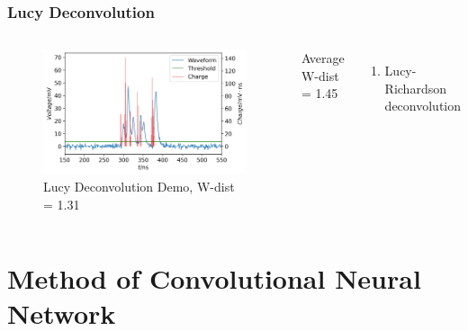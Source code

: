\documentclass{beamer}
\begin{document}
\begin{frame}
\frametitle{Lucy Deconvolution}
\begin{columns}
\begin{figure}
    \centering
    \caption{Lucy Deconvolution Demo, W-dist = 1.31}
    \includegraphics[width=1.0\linewidth]{img/lucyddm.png}
\end{figure}
\vspace{-4mm}
\begin{center}
    Average W-dist = 1.45
\end{center}
\begin{enumerate}
    \item Lucy-Richardson deconvolution
\end{enumerate}
\end{columns}
\end{frame}

\section{Method of Convolutional Neural Network}
\end{document}
